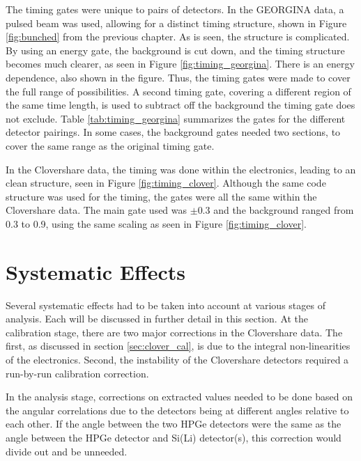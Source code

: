 The timing gates were unique to pairs of detectors. In the GEORGINA data, a pulsed beam was used, allowing for a distinct timing structure, shown in Figure \ref{fig:bunched} from the previous chapter. As is seen, the structure is complicated. By using an energy gate, the background is cut down, and the timing structure becomes much clearer, as seen in Figure \ref{fig:timing_georgina}. There is an energy dependence, also shown in the figure. Thus, the timing gates were made to cover the full range of possibilities. A second timing gate, covering a different region of the same time length, is used to subtract off the background the timing gate does not exclude. Table \ref{tab:timing_georgina} summarizes the gates for the different detector pairings. In some cases, the background gates needed two sections, to cover the same range as the original timing gate.





In the Clovershare data, the timing was done within the electronics, leading to an clean structure, seen in Figure \ref{fig:timing_clover}. Although the same code structure was used for the timing, the gates were all the same within the Clovershare data. The main gate used was $\pm0.3$ and the background ranged from 0.3 to 0.9, using the same scaling as seen in Figure \ref{fig:timing_clover}.



\section{Systematic Effects}

Several systematic effects had to be taken into account at various stages of analysis. Each will be discussed in further detail in this section. At the calibration stage, there are two major corrections in the Clovershare data. The first, as discussed in section \ref{sec:clover_cal}, is due to the integral non-linearities of the electronics. Second, the instability of the Clovershare detectors required a run-by-run calibration correction. 

In the analysis stage, corrections on extracted values needed to be done based on the angular correlations due to the detectors being at different angles relative to each other. If the angle between the two HPGe detectors were the same as the angle between the HPGe detector and Si(Li) detector(s), this correction would divide out and be unneeded.

